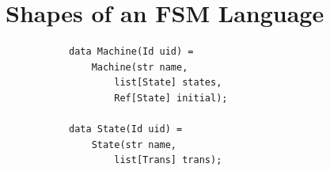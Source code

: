 \section{Shapes of an FSM Language}
\label{sec:eval}


\begin{figure}[bt]
	\centering
	\begin{subfigure}[b]{.3\columnwidth}
		\begin{lstlisting}[label=lst:fsm-adt, language=Rascal, numbers=none, xleftmargin=0pt, tabsize=1]
data Machine(Id uid) =
	Machine(str name,
		list[State] states,
		Ref[State] initial);

data State(Id uid) =
	State(str name,
		list[Trans] trans);


\end{lstlisting}
\end{subfigure}
\end{figure}
